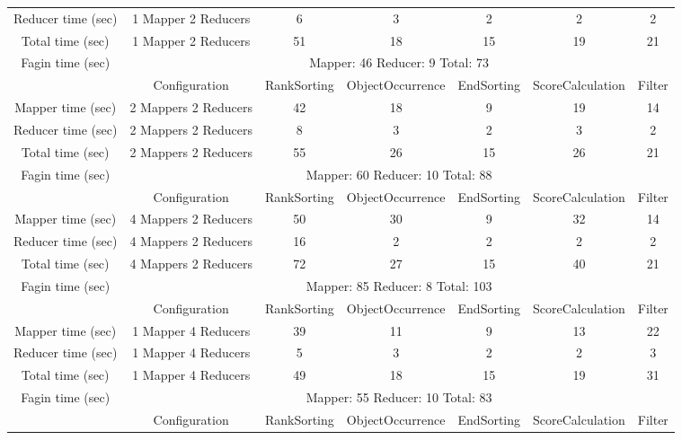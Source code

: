 \documentclass[a4paper]{article}
\begin{document}
\begin{table}[htbp]
{\begin{tabular}{|c|c|c|c|c|c|c|}
            Reducer time (sec) & 1 Mapper 2 Reducers & 6 & 3 & 2 & 2 & 2   \\
            Total time (sec) & 1 Mapper 2 Reducers & 51 & 18 & 15 & 19 & 21 \\
            \hline
            Fagin time (sec) & \multicolumn{6}{|c|}{Mapper: 46 Reducer: 9 Total: 73}  \\
            \hline
            \hline
             & Configuration & RankSorting & ObjectOccurrence & EndSorting & ScoreCalculation & Filter  \\
            \hline
            Mapper time (sec) & 2 Mappers 2 Reducers & 42 & 18 & 9 & 19 & 14  \\
            Reducer time (sec) & 2 Mappers 2 Reducers & 8 & 3 & 2 & 3 & 2   \\
            Total time (sec) & 2 Mappers 2 Reducers & 55 & 26 & 15 & 26 & 21 \\
            \hline
            Fagin time (sec) & \multicolumn{6}{|c|}{Mapper: 60 Reducer: 10 Total: 88}  \\
            \hline
            \hline
             & Configuration & RankSorting & ObjectOccurrence & EndSorting & ScoreCalculation & Filter  \\
            \hline
            Mapper time (sec) & 4 Mappers 2 Reducers & 50 & 30 & 9 & 32 & 14  \\
            Reducer time (sec) & 4 Mappers 2 Reducers & 16 & 2 & 2 & 2 & 2   \\
            Total time (sec) & 4 Mappers 2 Reducers & 72 & 27 & 15 & 40 & 21 \\
            \hline
            Fagin time (sec) & \multicolumn{6}{|c|}{Mapper: 85 Reducer: 8 Total: 103}  \\
            \hline
            \hline
             & Configuration & RankSorting & ObjectOccurrence & EndSorting & ScoreCalculation & Filter  \\
            \hline
            Mapper time (sec) & 1 Mapper 4 Reducers & 39 & 11 & 9 & 13 & 22  \\
            Reducer time (sec) & 1 Mapper 4 Reducers & 5 & 3 & 2 & 2 & 3  \\
            Total time (sec) & 1 Mapper 4 Reducers & 49 & 18 & 15 & 19 & 31 \\
            \hline
            Fagin time (sec) & \multicolumn{6}{|c|}{Mapper: 55 Reducer: 10 Total: 83}  \\
            \hline
            \hline
             & Configuration & RankSorting & ObjectOccurrence & EndSorting & ScoreCalculation & Filter  \\

\end{tabular}}
\end{table}
\end{document}

